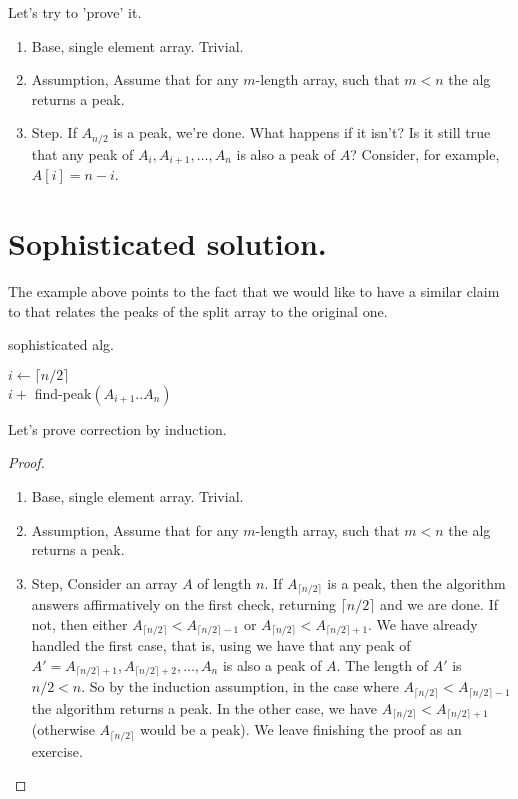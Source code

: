 Let's try to 'prove' it.  
\begin{enumerate}
 \item Base, single element array. Trivial. 
  \item Assumption, Assume that for any $m$-length array, such that $m<n$ the alg returns a peak. 
  \item Step. If $A_{n/2}$ is a peak, we're done. What happens if it isn't? Is it still true that any peak of $A_{i},A_{i+1}, \ldots, A_{n}$ is also a peak of $A$? Consider, for example, $A[i] = n - i$.
\end{enumerate}

\section{Sophisticated solution.}
The example above points to the fact that we would like to have a similar claim to  that relates the peaks of the split array to the original one.  
\begin{algorithm}
\caption{sophisticated alg.}
$ i \leftarrow  \lceil n/2 \rceil $\\
         { 
          \Return $i + $ find-peak$\left(A_{i+1}..A_{n}\right)$
        }
\end{algorithm}
Let's prove correction by induction.
\begin{proof}
\begin{enumerate}
  \item Base, single element array. Trivial. 
  \item Assumption, Assume that for any $m$-length array, such that $m<n$ the alg returns a peak. 
  \item Step, Consider an array $A$ of length $n$. If $A_{\lceil n/2 \rceil}$ is a peak, then the algorithm answers affirmatively on the first check, returning $\lceil n/2 \rceil$ and we are done. If not, then either $A_{\lceil n/2 \rceil} < A_{\lceil n/2 \rceil - 1}$ or $A_{\lceil n/2 \rceil} < A_{\lceil n/2 \rceil + 1}$. We have already handled the first case, that is, using  we have that any peak of $A' = A_{\lceil n/2 \rceil + 1}, A_{\lceil n/2 \rceil + 2}, \dots, A_n$ is also a peak of $A$. The length of $A'$ is $n/2 < n$. So by the induction assumption, in the case where $A_{\lceil n/2 \rceil} < A_{\lceil n/2 \rceil - 1}$ the algorithm returns a peak. In the other case, we have $A_{\lceil n/2 \rceil} < A_{\lceil n/2 \rceil + 1}$ (otherwise $A_{\lceil n/2 \rceil}$ would be a peak). We leave finishing the proof as an exercise.
\end{enumerate}

\end{proof}

